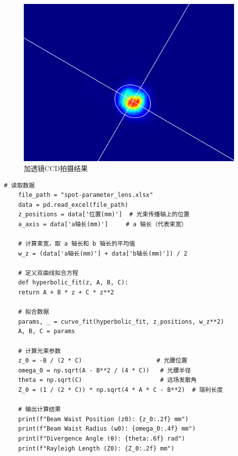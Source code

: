 \begin{figure}[H]
\begin{minipage}{0.3\textwidth}
		\includegraphics[width=\textwidth]{images/APL1_8_exp4_ccdT}
		\caption{加透镜CCD拍摄结果}
		\label{fig:apl18exp4ccdt}
	\end{minipage}
	
\end{figure}

\clearpage
\begin{lstlisting}[style=pythonstyle,caption=核心代码记录]
	# 读取数据
	file_path = "spot-parameter_lens.xlsx"
	data = pd.read_excel(file_path)
	z_positions = data['位置(mm)']  # 光束传播轴上的位置
	a_axis = data['a轴长(mm)']     # a 轴长（代表束宽）
	
	# 计算束宽，取 a 轴长和 b 轴长的平均值
	w_z = (data['a轴长(mm)'] + data['b轴长(mm)']) / 2
	
	# 定义双曲线拟合方程
	def hyperbolic_fit(z, A, B, C):
	return A + B * z + C * z**2
	
	# 拟合数据
	params, _ = curve_fit(hyperbolic_fit, z_positions, w_z**2)
	A, B, C = params
	
	# 计算光束参数
	z_0 = -B / (2 * C)                     # 光腰位置
	omega_0 = np.sqrt(A - B**2 / (4 * C))   # 光腰半径
	theta = np.sqrt(C)                      # 远场发散角
	Z_0 = (1 / (2 * C)) * np.sqrt(4 * A * C - B**2)  # 瑞利长度
	
	# 输出计算结果
	print(f"Beam Waist Position (z0): {z_0:.2f} mm")
	print(f"Beam Waist Radius (ω0): {omega_0:.4f} mm")
	print(f"Divergence Angle (θ): {theta:.6f} rad")
	print(f"Rayleigh Length (Z0): {Z_0:.2f} mm")
\end{lstlisting}

